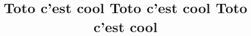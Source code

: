 \documentclass{plasci-secastro}
\title{Toto c'est cool Toto c'est cool Toto c'est cool}
\begin{document}
\lipsum
\lipsum
\end{document}
